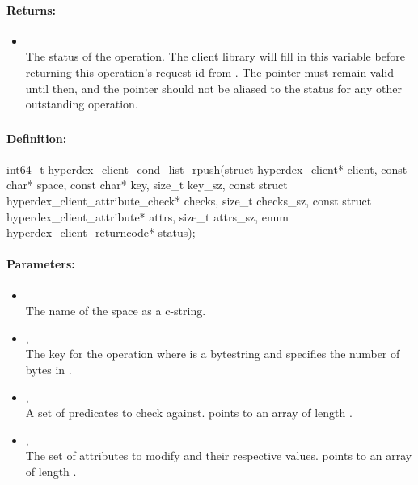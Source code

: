 \paragraph{Returns:}
\begin{itemize}[noitemsep]
\item {}\\
The status of the operation.  The client library will fill in this variable before returning this operation's request id from .  The pointer must remain valid until then, and the pointer should not be aliased to the status for any other outstanding operation.
\end{itemize}

\pagebreak
\subsubsection{}
\label{api:c:cond_list_rpush}


\paragraph{Definition:}
\begin{ccode}
int64_t hyperdex_client_cond_list_rpush(struct hyperdex_client* client,
        const char* space,
        const char* key, size_t key_sz,
        const struct hyperdex_client_attribute_check* checks, size_t checks_sz,
        const struct hyperdex_client_attribute* attrs, size_t attrs_sz,
        enum hyperdex_client_returncode* status);
\end{ccode}

\paragraph{Parameters:}
\begin{itemize}[noitemsep]
\item {}\\
The name of the space as a c-string.
\item {}, \\
The key for the operation where  is a bytestring and  specifies the number of bytes in .
\item {}, \\
A set of predicates to check against.   points to an array of length .
\item {}, \\
The set of attributes to modify and their respective values.   points to an array of length .
\end{itemize}

